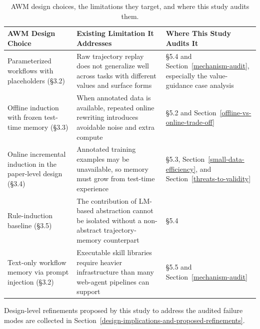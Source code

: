 \documentclass{article}
\begin{document}
{\begin{longtable}[]{@{}
  >{\raggedright\arraybackslash}p{}
  >{\raggedright\arraybackslash}p{}
  >{\raggedright\arraybackslash}p{}@{}}
\caption{AWM design choices, the limitations they target, and where this study audits them.}\label{tab:awm-design-choice-rationale}\\

\toprule\noalign{}
\begin{minipage}[b]{\linewidth}\raggedright
AWM Design Choice
\end{minipage} & \begin{minipage}[b]{\linewidth}\raggedright
Existing Limitation It Addresses
\end{minipage} & \begin{minipage}[b]{\linewidth}\raggedright
Where This Study Audits It
\end{minipage} \\
\midrule\noalign{}
\endhead
\bottomrule\noalign{}
\endlastfoot
Parameterized workflows with placeholders (§3.2) & Raw trajectory replay
does not generalize well across tasks with different values and surface
forms & §5.4 and Section~\ref{mechanism-audit}, especially the
value-guidance case analysis \\
Offline induction with frozen test-time memory (§3.3) & When annotated
data is available, repeated online rewriting introduces avoidable noise
and extra compute & §5.2 and Section~\ref{offline-vs-online-trade-off} \\
Online incremental induction in the paper-level design (§3.4) &
Annotated training examples may be unavailable, so memory must grow from
test-time experience & §5.3, Section~\ref{small-data-efficiency}, and
Section~\ref{threats-to-validity} \\
Rule-induction baseline (§3.5) & The contribution of LM-based
abstraction cannot be isolated without a non-abstract trajectory-memory
counterpart & §5.4 \\
Text-only workflow memory via prompt injection (§3.2) & Executable skill
libraries require heavier infrastructure than many web-agent pipelines
can support & §5.5 and Section~\ref{mechanism-audit} \\
\end{longtable}
}

Design-level refinements proposed by this study to address the audited
failure modes are collected in
Section~\ref{design-implications-and-proposed-refinements}.
\end{document}
